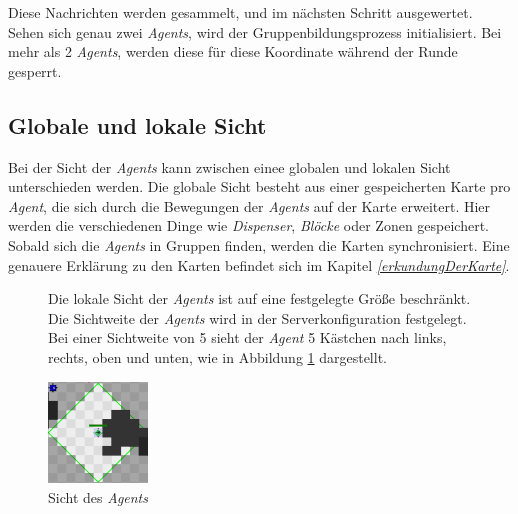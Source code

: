 Diese Nachrichten werden gesammelt, und im nächsten Schritt ausgewertet. Sehen sich genau zwei \textit{Agents}, wird der Gruppenbildungsprozess initialisiert. Bei mehr als 2 \textit{Agents}, werden diese für diese Koordinate während der Runde gesperrt. \\


\subsection{Globale und lokale Sicht} \label{kap:lokaleSicht}
Bei der Sicht der \textit{Agents} kann zwischen einee globalen und lokalen Sicht unterschieden werden. Die globale Sicht besteht aus einer gespeicherten Karte pro \textit{Agent}, die sich durch die Bewegungen der \textit{Agents} auf der Karte erweitert. Hier werden die verschiedenen Dinge wie \textit{Dispenser}, \textit{Blöcke} oder Zonen gespeichert. Sobald sich die \textit{Agents} in Gruppen finden, werden die Karten synchronisiert. Eine genauere Erklärung zu den Karten befindet sich im Kapitel \textit{\ref{erkundungDerKarte}}.

\begin{figure}
	\begin{minipage}{0.6\textwidth}
		Die lokale Sicht der \textit{Agents} ist auf eine festgelegte Größe beschränkt. Die Sichtweite der \textit{Agents} wird in der Serverkonfiguration festgelegt. Bei einer Sichtweite von 5 sieht der \textit{Agent} 5 Kästchen nach links, rechts, oben und unten, wie in Abbildung \ref{fig:agentensicht} dargestellt.
	\end{minipage}
	\begin{minipage}{0.4\textwidth}
		\centering
		\includegraphics[width=100px]{bilder/agentensicht}
		\caption{Sicht des \textit{Agents}}
		\label{fig:agentensicht}
	\end{minipage}
\end{figure}

